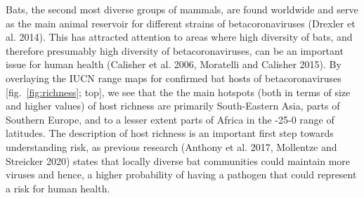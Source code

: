 \documentclass[11pt]{article}
\begin{document}
Bats, the second most diverse groups of mammals, are found worldwide and
serve as the main animal reservoir for different strains of
betacoronaviruses (Drexler et al. 2014). This has attracted attention to
areas where high diversity of bats, and therefore presumably high
diversity of betacoronaviruses, can be an important issue for human
health (Calisher et al. 2006, Moratelli and Calisher 2015). By
overlaying the IUCN range maps for confirmed bat hosts of
betacoronaviruses {[}fig.~\ref{fig:richness}; top{]}, we see that the
the main hotspots (both in terms of size and higher values) of host
richness are primarily South-Eastern Asia, parts of Southern Europe, and
to a lesser extent parts of Africa in the -25-0 range of latitudes. The
description of host richness is an important first step towards
understanding risk, as previous research (Anthony et al. 2017, Mollentze
and Streicker 2020) states that locally diverse bat communities could
maintain more viruses and hence, a higher probability of having a
pathogen that could represent a risk for human health.
\end{document}
